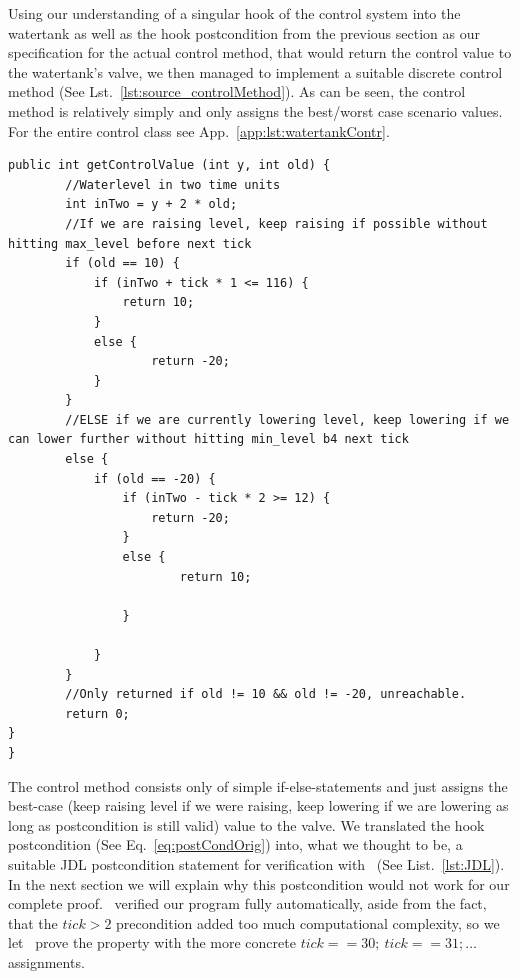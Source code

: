 Using our understanding of a singular hook of the control system into the watertank as well as the hook postcondition from the previous section as our specification for the actual control method, that would return the control value to the watertank's valve, we then managed to implement a suitable discrete control method (See Lst.~\ref{lst:source_controlMethod}). As can be seen, the control method is relatively simply and only assigns the best/worst case scenario values. For the entire control class see App.~\ref{app:lst:watertankContr}.

\begin{lstlisting}[label=lst:source_controlMethod]
public int getControlValue (int y, int old) {
		//Waterlevel in two time units
		int inTwo = y + 2 * old;
		//If we are raising level, keep raising if possible without hitting max_level before next tick
		if (old == 10) {
			if (inTwo + tick * 1 <= 116) {
				return 10;
			}
			else {
					return -20;
			}
		}
		//ELSE if we are currently lowering level, keep lowering if we can lower further without hitting min_level b4 next tick
		else {
			if (old == -20) {
				if (inTwo - tick * 2 >= 12) {
					return -20;
				}
				else {
						return 10;
				
				}
		
			}
		}
		//Only returned if old != 10 && old != -20, unreachable.
		return 0;
}
}
\end{lstlisting}

The control method consists only of simple if-else-statements and just assigns the best-case (keep raising level if we were raising, keep lowering if we are lowering as long as postcondition is still valid) value to the valve. We translated the hook postcondition (See  Eq.~\ref{eq:postCondOrig}) into, what we thought to be, a suitable JDL postcondition statement for verification with \key~(See List.~\ref{lst:JDL}). In the next section we will explain why this postcondition would not work for our complete proof. \key~verified our program fully automatically, aside from the fact, that the \(tick>2\) precondition added too much computational complexity, so we let \key~prove the property with the more concrete \(tick==30;~tick==31;\dots\) assignments. 

